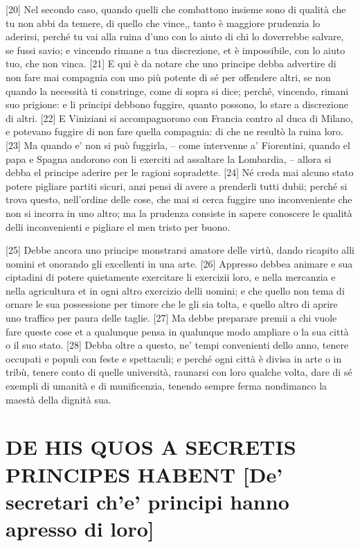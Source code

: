 {[}20{]} Nel secondo caso, quando quelli che combattono insieme sono di
qualità che tu non abbi da temere, di quello che vince,, tanto è
maggiore prudenzia lo aderirsi, perché tu vai alla ruina d'uno con lo
aiuto di chi lo doverrebbe salvare, se fussi savio; e vincendo rimane a
tua discrezione, et è impossibile, con lo aiuto tuo, che non vinca.
{[}21{]} E qui è da notare che uno principe debba advertire di non fare
mai compagnia con uno più potente di sé per offendere altri, se non
quando la necessità ti constringe, come di sopra si dice; perché,
vincendo, rimani suo prigione: e li principi debbono fuggire, quanto
possono, lo stare a discrezione di altri. {[}22{]} E Viniziani si
accompagnorono con Francia contro al duca di Milano, e potevano fuggire
di non fare quella compagnia: di che ne resultò la ruina loro. {[}23{]}
Ma quando e' non si può fuggirla, -- come intervenne a' Fiorentini,
quando el papa e Spagna andorono con li exerciti ad assaltare la
Lombardia, -- allora si debba el principe aderire per le ragioni sopradette. {[}24{]} Né creda mai alcuno stato potere pigliare partiti sicuri, anzi pensi di avere a prenderli tutti dubii; perché si trova questo, nell'ordine delle cose, che mai si cerca fuggire uno inconveniente che non si incorra in uno altro; ma la prudenza consiste in sapere conoscere le qualità delli inconvenienti e pigliare el men tristo per buono.

{[}25{]} Debbe ancora uno principe monstrarsi amatore delle virtù, dando
ricapito alli uomini et onorando gli excellenti in una arte. {[}26{]}
Appresso debbea animare e sua ciptadini di potere quietamente exercitare
li exercizii loro, e nella mercanzia e nella agricultura et in ogni
altro exercizio delli uomini; e che quello non tema di ornare le sua
possessione per timore che le gli sia tolta, e quello altro di aprire
uno traffico per paura delle taglie. {[}27{]} Ma debbe preparare premii
a chi vuole fare queste cose et a qualunque pensa in qualunque modo
ampliare o la sua città o il suo stato. {[}28{]} Debba oltre a questo,
ne' tempi convenienti dello anno, tenere occupati e populi con feste e
spettaculi; e perché ogni città è divisa in arte o in tribù, tenere
conto di quelle università, raunarsi con loro qualche volta, dare di sé
exempli di umanità e di munificenzia, tenendo sempre ferma nondimanco la
maestà della dignità sua.

\quebra\section{DE HIS QUOS A SECRETIS PRINCIPES HABENT
{[}De' secretari ch'e' principi hanno apresso di loro{]}}


